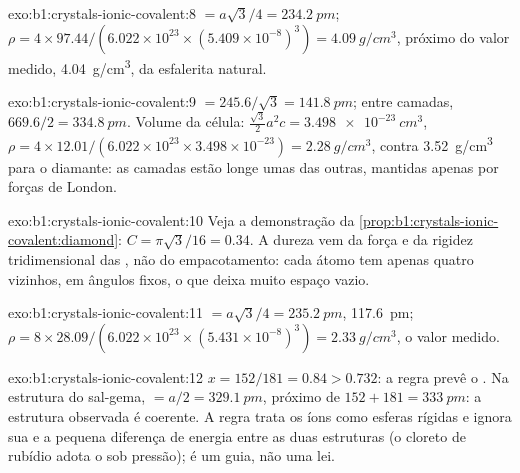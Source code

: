 \begin{solution}{exo:b1:crystals-ionic-covalent:8}
 $= a\sqrt3/4 = \qty{234.2}{pm}$;
$\rho = 4 \times 97.44/(6.022 \times 10^{23} \times (5.409 \times
10^{-8})^3) = \qty{4.09}{g/cm^3}$, próximo do valor medido,
\qty{4.04}{g/cm^3}, da esfalerita natural.
\end{solution}

\begin{solution}{exo:b1:crystals-ionic-covalent:9}
 $= 245.6/\sqrt3 = \qty{141.8}{pm}$; entre camadas, $669.6/2 =
\qty{334.8}{pm}$. Volume da célula: $\frac{\sqrt3}{2}a^2c = \qty{3.498e-23}{cm^3}$,
$\rho = 4 \times 12.01/(6.022 \times 10^{23} \times 3.498 \times 10^{-23})
= \qty{2.28}{g/cm^3}$, contra \qty{3.52}{g/cm^3} para o diamante: as
camadas estão longe umas das outras, mantidas apenas por forças de London.
\end{solution}

\begin{solution}{exo:b1:crystals-ionic-covalent:10}
Veja a demonstração da \cref{prop:b1:crystals-ionic-covalent:diamond}:
$C = \pi\sqrt3/16 = 0.34$. A dureza vem da força e da rigidez
tridimensional das , não do empacotamento: cada átomo
tem apenas quatro vizinhos, em ângulos fixos, o que deixa muito espaço
vazio.
\end{solution}

\begin{solution}{exo:b1:crystals-ionic-covalent:11}
 $= a\sqrt3/4 = \qty{235.2}{pm}$, 
\qty{117.6}{pm}; $\rho = 8 \times 28.09/(6.022 \times 10^{23} \times
(5.431 \times 10^{-8})^3) = \qty{2.33}{g/cm^3}$, o valor medido.
\end{solution}

\begin{solution}{exo:b1:crystals-ionic-covalent:12}
$x = 152/181 = 0.84 > 0.732$: a regra prevê o .
Na estrutura do sal-gema,  $= a/2 = \qty{329.1}{pm}$, próximo de
$152 + 181 = \qty{333}{pm}$: a estrutura observada é coerente. A regra
trata os íons como esferas rígidas e ignora sua  e a
pequena diferença de energia entre as duas estruturas (o cloreto de
rubídio adota o  sob pressão); é um guia, não uma
lei.
\end{solution}

